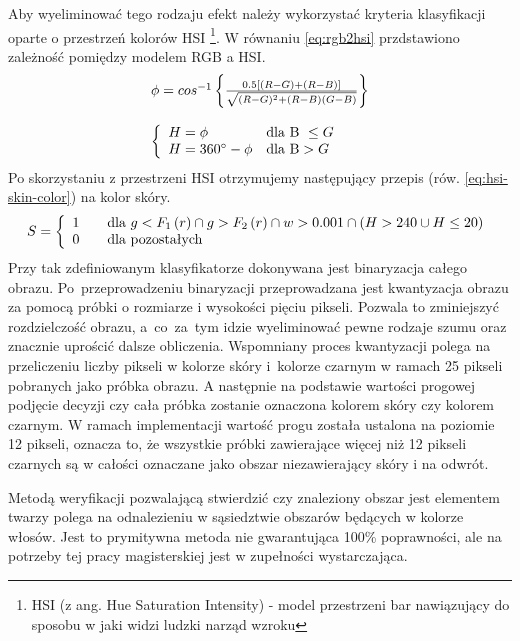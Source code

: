 Aby wyeliminować tego rodzaju efekt należy wykorzystać kryteria klasyfikacji oparte
o przestrzeń kolorów HSI \footnote{HSI (z ang. Hue Saturation Intensity) -
model przestrzeni bar nawiązujący do sposobu w jaki widzi ludzki narząd wzroku }.
W równaniu \ref{eq:rgb2hsi} przdstawiono zależność pomiędzy modelem RGB a HSI.
\begin{equation}
\label{eq:rgb2hsi}
\begin{array}{l}
\phi = cos^{-1}\left\{ \frac{0.5[(R-G)+(R-B)]}{\sqrt{(R-G)^2 + (R-B)(G-B)}}
\right\}\\\\
\left\{
\begin{array}{l l}
H=\phi & \mbox{dla B }\leq G\\
H=360^{\circ}-\phi & \mbox{dla B} > G
\end{array}
\right.
\end{array}
\end{equation}
Po skorzystaniu z przestrzeni HSI otrzymujemy następujący przepis  (rów.
\ref{eq:hsi-skin-color}) na kolor skóry.
\begin{equation}
\label{eq:hsi-skin-color}
S = \left\{ 
\begin{array}{l l}
  1 & \quad \mbox{dla $g < F_1\left(r\right) \cap g > F_2\left(r\right) \cap w
  > 0.001 \cap (H > 240 \cup H \leq 20 )$}\\ 0 & \quad \mbox{dla pozostałych}\\
  \end{array} \right.
  \label{skinEq2}
\end{equation}
Przy tak zdefiniowanym klasyfikatorze dokonywana jest binaryzacja całego obrazu.
Po~przeprowadzeniu binaryzacji przeprowadzana jest kwantyzacja obrazu za pomocą
próbki o rozmiarze i wysokości pięciu pikseli. Pozwala to zminiejszyć
rozdzielczość obrazu, a~co~za~tym idzie wyeliminować pewne rodzaje szumu oraz
znacznie uprościć dalsze obliczenia. Wspomniany proces kwantyzacji polega na
przeliczeniu liczby pikseli w kolorze skóry i~kolorze czarnym w ramach 25
pikseli pobranych jako próbka obrazu. A następnie na podstawie wartości progowej
podjęcie decyzji czy cała próbka zostanie oznaczona kolorem skóry czy kolorem
czarnym. W ramach implementacji wartość progu została ustalona na poziomie 12
pikseli, oznacza to, że wszystkie próbki zawierające więcej niż 12 pikseli
czarnych są w całości oznaczane jako obszar niezawierający skóry i na odwrót.

Metodą weryfikacji pozwalającą stwierdzić czy znaleziony obszar
jest elementem twarzy polega na odnalezieniu w sąsiedztwie obszarów będących w
kolorze włosów. Jest to prymitywna metoda nie gwarantująca 100\% poprawności,
ale na potrzeby tej pracy magisterskiej jest w zupełności wystarczająca. 

